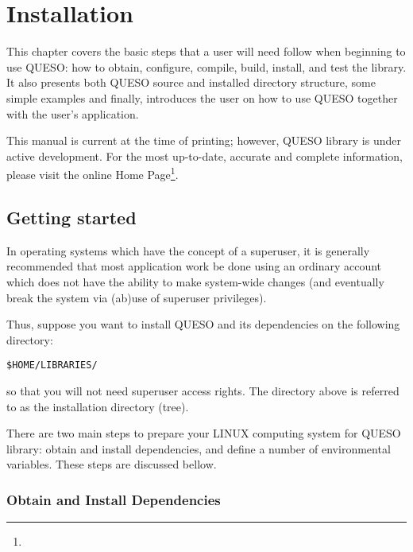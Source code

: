 \chapter{Installation}\label{ch-install}
\thispagestyle{headings}


  
This chapter covers the basic steps that a user will need follow when beginning to use QUESO: 
how to obtain, configure, compile, build, install, and test the library.  It also presents both QUESO source and installed directory structure, some simple examples and finally,  introduces the user on how to use QUESO together with the user's  application.

This manual is current at the time of printing; however, QUESO library  is under active development.
For the most up-to-date, accurate and complete information, please visit the online \Queso{} Home Page\footnote{\Quesoweb}.
        
\section{Getting started}\label{sec:Pre_Queso}

In operating systems which have the concept of a superuser, it is generally recommended that most application work be done 
using an ordinary account which does not have the ability to make system-wide changes (and eventually break the system via 
(ab)use of superuser privileges).

Thus, suppose you want to install QUESO and its dependencies on the following directory:
\begin{lstlisting}
$HOME/LIBRARIES/
\end{lstlisting}
%
so that you will not need superuser access rights. The directory above is referred to as the \Queso{} installation directory (tree).

There are two main steps to prepare your LINUX computing system  for QUESO library: obtain and install \Queso{} dependencies, and define a number of environmental variables. These steps are discussed bellow.


\subsection{Obtain and Install \Queso{} Dependencies}

